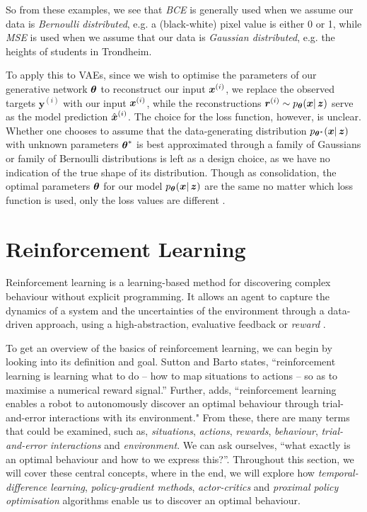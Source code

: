 So from these examples, we see that \textit{BCE} is generally used when we assume our data is \textit{Bernoulli distributed}, e.g. a (black-white) pixel value is either 0 or 1, while \textit{MSE} is used when we assume that our data is \textit{Gaussian distributed}, e.g. the heights of students in Trondheim.

To apply this to VAEs, since we wish to optimise the parameters of our generative network $\boldsymbol{\theta}$ to reconstruct our input $\boldsymbol{x}^{(i)}$, we replace the observed targets $\boldsymbol{y}^{(i)}$ with our input $\boldsymbol{x}^{(i)}$, while the reconstructions $\boldsymbol{r}^{(i)} \sim p_{\boldsymbol{\theta}}(\boldsymbol{x} |\, \boldsymbol{z})$
serve as the model prediction $\hat{\boldsymbol{x}}^{(i)}$. The choice for the loss function, however, is unclear. Whether one chooses to assume that the data-generating distribution $p_{\boldsymbol{\theta}^*}(\boldsymbol{x}|\, \boldsymbol{z})$ with unknown parameters $\boldsymbol{\theta}^*$ is best approximated through a family of Gaussians or family of Bernoulli distributions is left as a design choice, as we have no indication of the true shape of its distribution.
Though as consolidation, the optimal parameters $\boldsymbol{\theta}$ for our model $p_{\boldsymbol{\theta}}(\boldsymbol{x} |\, \boldsymbol{z})$ are the same no matter which loss function is used, only the loss values are different \cite{DeepLearningBook}. 

\section{Reinforcement Learning}
\label{sec:2_RL}
Reinforcement learning is a learning-based method for discovering complex behaviour without explicit programming. It allows an agent to capture the dynamics of a system and the uncertainties of the environment through a data-driven approach, using a high-abstraction, evaluative feedback or \textit{reward} \cite{RLinRoboticsSurvey}.

To get an overview of the basics of reinforcement learning, we can begin by looking into its definition and goal. Sutton and Barto \cite{suttonAndBartoBook} states, “reinforcement learning is learning what to do – how to map situations to actions – so as to maximise a numerical reward signal.” Further, \cite{RLinRoboticsSurvey} adds, “reinforcement learning enables a robot to autonomously discover an optimal behaviour through trial-and-error interactions with its environment." 
From these, there are many terms that could be examined, such as, \textit{situations}, \textit{actions}, \textit{rewards}, \textit{behaviour}, \textit{trial-and-error interactions} and \textit{environment}. We can ask ourselves, “what exactly is an optimal behaviour and how to we express this?”.
Throughout this section, we will cover these central concepts, where in the end, we will explore how \textit{temporal-difference learning}, \textit{policy-gradient methods}, \textit{actor-critics} and \textit{proximal policy optimisation} algorithms enable us to discover an optimal behaviour.

